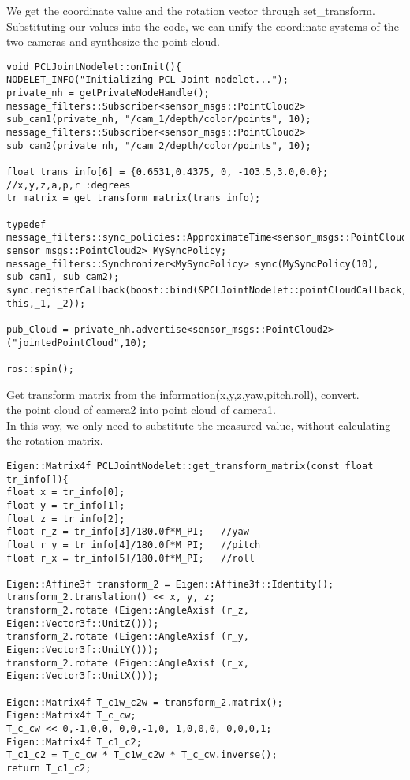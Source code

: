 We get the coordinate value and the rotation vector through set\_transform. Substituting our values into the code, we can unify the coordinate systems of the two cameras and synthesize the point cloud.\\
\begin{lstlisting}[caption={}]
void PCLJointNodelet::onInit(){
NODELET_INFO("Initializing PCL Joint nodelet...");
private_nh = getPrivateNodeHandle();
message_filters::Subscriber<sensor_msgs::PointCloud2> sub_cam1(private_nh, "/cam_1/depth/color/points", 10);
message_filters::Subscriber<sensor_msgs::PointCloud2> sub_cam2(private_nh, "/cam_2/depth/color/points", 10);
			
float trans_info[6] = {0.6531,0.4375, 0, -103.5,3.0,0.0};  //x,y,z,a,p,r :degrees
tr_matrix = get_transform_matrix(trans_info);

typedef message_filters::sync_policies::ApproximateTime<sensor_msgs::PointCloud2, sensor_msgs::PointCloud2> MySyncPolicy;
message_filters::Synchronizer<MySyncPolicy> sync(MySyncPolicy(10), sub_cam1, sub_cam2);
sync.registerCallback(boost::bind(&PCLJointNodelet::pointCloudCallback, this,_1, _2));

pub_Cloud = private_nh.advertise<sensor_msgs::PointCloud2>("jointedPointCloud",10);

ros::spin();
\end{lstlisting}

Get transform matrix from the information(x,y,z,yaw,pitch,roll), convert.\\
the point cloud of camera2 into point cloud of camera1.\\
In this way, we only need to substitute the measured value, without calculating the rotation matrix.\\

\begin{lstlisting}[caption={}]
Eigen::Matrix4f PCLJointNodelet::get_transform_matrix(const float tr_info[]){
float x = tr_info[0];
float y = tr_info[1];
float z = tr_info[2];
float r_z = tr_info[3]/180.0f*M_PI;   //yaw
float r_y = tr_info[4]/180.0f*M_PI;   //pitch
float r_x = tr_info[5]/180.0f*M_PI;   //roll

Eigen::Affine3f transform_2 = Eigen::Affine3f::Identity();
transform_2.translation() << x, y, z;
transform_2.rotate (Eigen::AngleAxisf (r_z, Eigen::Vector3f::UnitZ()));
transform_2.rotate (Eigen::AngleAxisf (r_y, Eigen::Vector3f::UnitY()));
transform_2.rotate (Eigen::AngleAxisf (r_x, Eigen::Vector3f::UnitX()));

Eigen::Matrix4f T_c1w_c2w = transform_2.matrix();
Eigen::Matrix4f T_c_cw;
T_c_cw << 0,-1,0,0, 0,0,-1,0, 1,0,0,0, 0,0,0,1;
Eigen::Matrix4f T_c1_c2;
T_c1_c2 = T_c_cw * T_c1w_c2w * T_c_cw.inverse();
return T_c1_c2;
\end{lstlisting}



